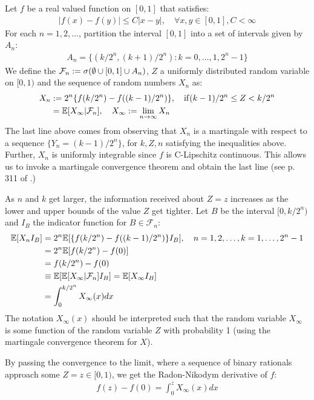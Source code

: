 \begin{defn}
	Let $f$ be a real valued function on $[0, 1]$ that satisfies:
	\begin{align}
	|f(x) - f(y)| \leq C|x-y|, \quad \forall x,y \in [0,1], C < \infty 	
	\end{align}
	For each $n = 1, 2, \hdots$, partition the interval $[0,1]$ into a set of intervals given by $A_n$:
	\begin{align}
	A_n = \{ (k/2^n, (k+1)/2^n): k = 0, \hdots, 1, 2^n -1  \}
	\end{align}
	We define the $\mathcal{F}_n := \sigma(\emptyset \cup [0,1] \cup A_n)$, $Z$ a uniformly distributed random variable on $[0, 1)$ and the sequence of random numbers $X_n$ as:
	\begin{align}
	X_n &:= 2^n \{f(k/2^n) - f((k-1)/2^n)\}, \quad \mathrm{if} (k-1)/2^n \leq Z < k/2^n \\
	&=\mathbb{E}[X_\infty | \mathcal{F}_n], \quad X_\infty:= \lim_{n \to \infty} X_n
	\end{align} The last line above comes from observing that $X_n$ is a martingale with respect to a sequence $\{Y_n = (k-1) / 2^n \}$, for $k,Z,n$ satisfying the inequalities above. Further, $X_n$ is uniformly integrable since $f$ is C-Lipschitz continuous. This allows us to invoke a martingale convergence theorem and obtain the last line (see p. 311 of 
	\cite{karlin1975}.)
	
	As $n$ and $k$ get larger, the information received about $Z=z$ increases as the lower and upper bounds of the value $Z$ get tighter. Let $B$ be the interval $[0, k/2^n)$ and $I_B$ the indicator function for $B \in \mathcal{F}_n$:
	\begin{align}
	\mathbb{E}[X_nI_B] &= 2^n \mathbb{E}[ \{f(k/2^n) - f((k-1)/2^n)\} I_B], \quad n = 1, 2, \hdots, k = 1,\hdots, 2^n -1 \\
	&= 2^n \mathbb{E}[f(k/2^n) - f(0)] \\
	&= f(k/2^n) - f(0) \\
	&\equiv \mathbb{E}[\mathbb{E}[X_\infty | \mathcal{F}_n ]I_B] = \mathbb{E}[X_\infty I_B] \\
	&= \int_{0}^{k/2^n} X_\infty (x) dx
	\end{align} The notation $ X_\infty (x)$ should be interpreted such that the random variable $X_\infty$ is some function of the random variable $Z$ with probability 1 (using the martingale convergence theorem for $X$).
	
	By passing the convergence to the limit, where a sequence of binary rationals approach some $Z=z \in [0,1)$, we get the Radon-Nikodym derivative of $f$:
	\begin{align}
	f(z) - f(0) = \int_{0}^{z} X_\infty (x) dx
	\end{align}
\end{defn} 
